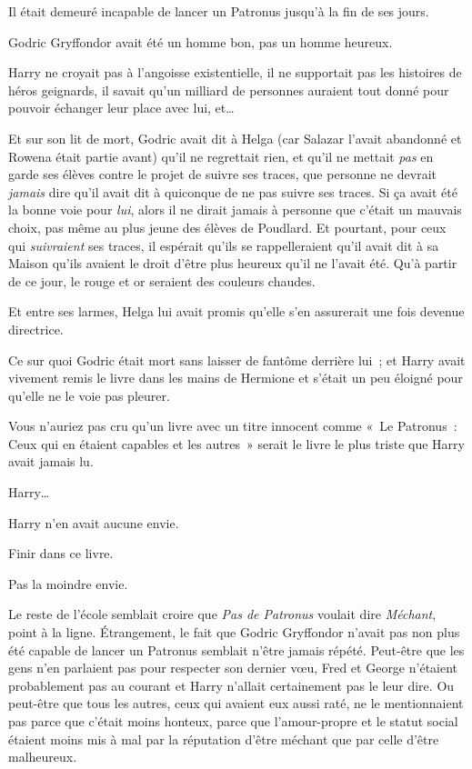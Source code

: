 Il était demeuré incapable de lancer un Patronus jusqu'à la fin de ses jours.

Godric Gryffondor avait été un homme bon, pas un homme heureux.

Harry ne croyait pas à l'angoisse existentielle, il ne supportait pas les histoires de héros geignards, il savait qu'un milliard de personnes auraient tout donné pour pouvoir échanger leur place avec lui, et…

Et sur son lit de mort, Godric avait dit à Helga (car Salazar l'avait abandonné et Rowena était partie avant) qu'il ne regrettait rien, et qu'il ne mettait \emph{pas} en garde ses élèves contre le projet de suivre ses traces, que personne ne devrait \emph{jamais} dire qu'il avait dit à quiconque de ne pas suivre ses traces.
Si ça avait été la bonne voie pour \emph{lui}, alors il ne dirait jamais à personne que c'était un mauvais choix, pas même au plus jeune des élèves de Poudlard.
Et pourtant, pour ceux qui \emph{suivraient} ses traces, il espérait qu'ils se rappelleraient qu'il avait dit à sa Maison qu'ils avaient le droit d'être plus heureux qu'il ne l'avait été.
Qu'à partir de ce jour, le rouge et or seraient des couleurs chaudes.

Et entre ses larmes, Helga lui avait promis qu'elle s'en assurerait une fois devenue directrice.

Ce sur quoi Godric était mort sans laisser de fantôme derrière lui~; et Harry avait vivement remis le livre dans les mains de Hermione et s'était un peu éloigné pour qu'elle ne le voie pas pleurer.

Vous n'auriez pas cru qu'un livre avec un titre innocent comme «~Le Patronus~: Ceux qui en étaient capables et les autres~» serait le livre le plus triste que Harry avait jamais lu.

Harry…

Harry n'en avait aucune envie.

Finir dans ce livre.

Pas la moindre envie.

Le reste de l'école semblait croire que \emph{Pas de Patronus} voulait dire \emph{Méchant}, point à la ligne.
Étrangement, le fait que Godric Gryffondor n'avait pas non plus été capable de lancer un Patronus semblait n'être jamais répété.
Peut-être que les gens n'en parlaient pas pour respecter son dernier vœu, Fred et George n'étaient probablement pas au courant et Harry n'allait certainement pas le leur dire.
Ou peut-être que tous les autres, ceux qui avaient eux aussi raté, ne le mentionnaient pas parce que c'était moins honteux, parce que l'amour-propre et le statut social étaient moins mis à mal par la réputation d'être méchant que par celle d'être malheureux.


